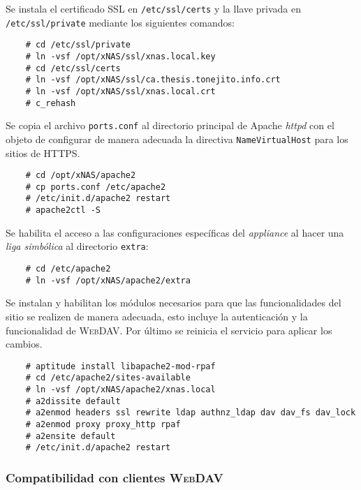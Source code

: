 Se instala el certificado \textsc{SSL} en \texttt{/etc/ssl/certs} y la llave privada en \texttt{/etc/ssl/private} mediante los siguientes comandos:

{
\scriptsize
\linespread{1}
\begin{verbatim}
    # cd /etc/ssl/private
    # ln -vsf /opt/xNAS/ssl/xnas.local.key
    # cd /etc/ssl/certs
    # ln -vsf /opt/xNAS/ssl/ca.thesis.tonejito.info.crt
    # ln -vsf /opt/xNAS/ssl/xnas.local.crt
    # c_rehash
\end{verbatim}
}

Se copia el archivo \texttt{ports.conf} al directorio principal de Apache \textit{httpd} con el objeto de configurar de manera adecuada la directiva \texttt{NameVirtualHost} para los sitios de \textsc{HTTPS}.

{
\scriptsize
\linespread{1}
\begin{verbatim}
    # cd /opt/xNAS/apache2
    # cp ports.conf /etc/apache2
    # /etc/init.d/apache2 restart
    # apache2ctl -S
\end{verbatim}
}

Se habilita el acceso a las configuraciones espec\'{i}ficas del \textit{appliance} al hacer una \textit{liga simb\'{o}lica} al directorio \texttt{extra}:

{
\scriptsize
\linespread{1}
\begin{verbatim}
    # cd /etc/apache2
    # ln -vsf /opt/xNAS/apache2/extra
\end{verbatim}
}

Se instalan y habilitan los m\'{odulos} necesarios para que las funcionalidades del sitio se realizen de manera adecuada, esto incluye la autenticaci\'{o}n y la funcionalidad de \textsc{WebDAV}. Por \'{u}ltimo se reinicia el servicio para aplicar los cambios.

{
\scriptsize
\linespread{1}
\begin{verbatim}
    # aptitude install libapache2-mod-rpaf
    # cd /etc/apache2/sites-available
    # ln -vsf /opt/xNAS/apache2/xnas.local
    # a2dissite default
    # a2enmod headers ssl rewrite ldap authnz_ldap dav dav_fs dav_lock
    # a2enmod proxy proxy_http rpaf
    # a2ensite default
    # /etc/init.d/apache2 restart
\end{verbatim}
}

        \subsubsection {Compatibilidad con clientes \textsc{WebDAV}}

